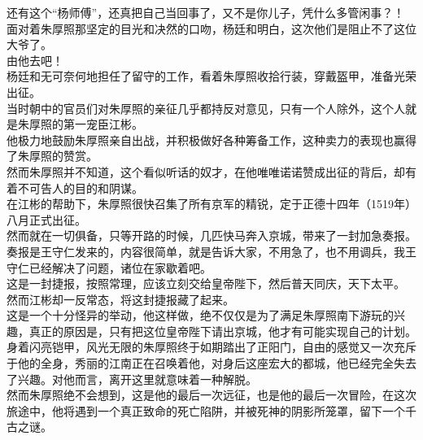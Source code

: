 \begin{multicols}{\theparacolNo}
还有这个“杨师傅”，还真把自己当回事了，又不是你儿子，凭什么多管闲事？！\\

面对着朱厚照那坚定的目光和决然的口吻，杨廷和明白，这次他们是阻止不了这位大爷了。\\

由他去吧！\\

杨廷和无可奈何地担任了留守的工作，看着朱厚照收拾行装，穿戴盔甲，准备光荣出征。\\

当时朝中的官员们对朱厚照的亲征几乎都持反对意见，只有一个人除外，这个人就是朱厚照的第一宠臣江彬。\\

他极力地鼓励朱厚照亲自出战，并积极做好各种筹备工作，这种卖力的表现也赢得了朱厚照的赞赏。\\

然而朱厚照并不知道，这个看似听话的奴才，在他唯唯诺诺赞成出征的背后，却有着不可告人的目的和阴谋。\\

在江彬的帮助下，朱厚照很快召集了所有京军的精锐，定于正德十四年（1519年）八月正式出征。\\

然而就在一切俱备，只等开路的时候，几匹快马奔入京城，带来了一封加急奏报。\\

奏报是王守仁发来的，内容很简单，就是告诉大家，不用急了，也不用调兵，我王守仁已经解决了问题，诸位在家歇着吧。\\

这是一封捷报，按照常理，应该立刻交给皇帝陛下，然后普天同庆，天下太平。\\

然而江彬却一反常态，将这封捷报藏了起来。\\

这是一个十分怪异的举动，他这样做，绝不仅仅是为了满足朱厚照南下游玩的兴趣，真正的原因是，只有把这位皇帝陛下请出京城，他才有可能实现自己的计划。\\

身着闪亮铠甲，风光无限的朱厚照终于如期踏出了正阳门，自由的感觉又一次充斥于他的全身，秀丽的江南正在召唤着他，对身后这座宏大的都城，他已经完全失去了兴趣。对他而言，离开这里就意味着一种解脱。\\

然而朱厚照绝不会想到，这是他的最后一次远征，也是他的最后一次冒险，在这次旅途中，他将遇到一个真正致命的死亡陷阱，并被死神的阴影所笼罩，留下一个千古之谜。\\


\end{multicols}
